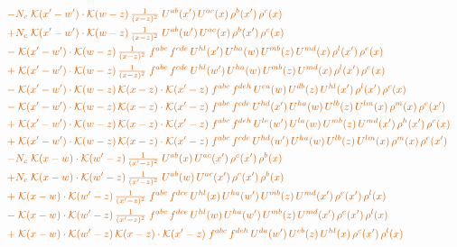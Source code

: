 \documentclass[10pt]{article}
\numberwithin{equation}{section}
\begin{document}
\begin{align}
&\quad{\color{BFK}-N_c\;\mathcal{K}(x'-w')\cdot\mathcal{K}(w-z)\,\tfrac{1}{(x-z)^{2}}\;U^{ab}(x')\,U^{ac}(x)\,\rho^{b}(x')\,\rho^{c}(x)}\notag\\
&\quad{\color{BFK}+N_c\;\mathcal{K}(x'-w')\cdot\mathcal{K}(w-z)\,\tfrac{1}{(x-z)^{2}}\;U^{ab}(w')\,U^{ac}(x)\,\rho^{b}(x')\,\rho^{c}(x)}\notag\\
&\quad{\color{BFK}-\;\mathcal{K}(x'-w')\cdot\mathcal{K}(w-z)\,\tfrac{1}{(x-z)^{2}}\;f^{abc}\,f^{cde}\,U^{hl}(x')\,U^{ha}(w)\,U^{mb}(z)\,U^{md}(x)\,\rho^{l}(x')\,\rho^{e}(x)}\notag\\
&\quad{\color{BFK}+\;\mathcal{K}(x'-w')\cdot\mathcal{K}(w-z)\,\tfrac{1}{(x-z)^{2}}\;f^{abc}\,f^{cde}\,U^{hl}(w')\,U^{ha}(w)\,U^{mb}(z)\,U^{md}(x)\,\rho^{l}(x')\,\rho^{e}(x)}\notag\\
&\quad{\color{BFK}-\;\mathcal{K}(x'-w')\cdot\mathcal{K}(w-z)\,\mathcal{K}(x-z)\cdot\mathcal{K}(x'-z)\;f^{abc}\,f^{deh}\,U^{ea}(w)\,U^{db}(z)\,U^{hl}(x')\,\rho^{l}(x')\,\rho^{c}(x)}\notag\\
&\quad{\color{BFK}-\;\mathcal{K}(x'-w')\cdot\mathcal{K}(w-z)\,\mathcal{K}(x-z)\cdot\mathcal{K}(x'-z)\;f^{abc}\,f^{cde}\,U^{hd}(x')\,U^{ha}(w)\,U^{lb}(z)\,U^{lm}(x)\,\rho^{m}(x)\,\rho^{e}(x')}\notag\\
&\quad{\color{BFK}+\;\mathcal{K}(x'-w')\cdot\mathcal{K}(w-z)\,\mathcal{K}(x-z)\cdot\mathcal{K}(x'-z)\;f^{abc}\,f^{deh}\,U^{le}(w')\,U^{la}(w)\,U^{mb}(z)\,U^{md}(x')\,\rho^{h}(x')\,\rho^{c}(x)}\notag\\
&\quad{\color{BFK}+\;\mathcal{K}(x'-w')\cdot\mathcal{K}(w-z)\,\mathcal{K}(x-z)\cdot\mathcal{K}(x'-z)\;f^{abc}\,f^{cde}\,U^{hd}(w')\,U^{ha}(w)\,U^{lb}(z)\,U^{lm}(x)\,\rho^{m}(x)\,\rho^{e}(x')}\notag\\
&\quad{\color{BFK}-N_c\;\mathcal{K}(x-w)\cdot\mathcal{K}(w'-z)\,\tfrac{1}{(x'-z)^{2}}\;U^{ab}(x)\,U^{ac}(x')\,\rho^{c}(x')\,\rho^{b}(x)}\notag\\
&\quad{\color{BFK}+N_c\;\mathcal{K}(x-w)\cdot\mathcal{K}(w'-z)\,\tfrac{1}{(x'-z)^{2}}\;U^{ab}(w)\,U^{ac}(x')\,\rho^{c}(x')\,\rho^{b}(x)}\notag\\
&\quad{\color{BFK}+\;\mathcal{K}(x-w)\cdot\mathcal{K}(w'-z)\,\tfrac{1}{(x'-z)^{2}}\;f^{abc}\,f^{dce}\,U^{hl}(x)\,U^{ha}(w')\,U^{mb}(z)\,U^{md}(x')\,\rho^{e}(x')\,\rho^{l}(x)}\notag\\
&\quad{\color{BFK}-\;\mathcal{K}(x-w)\cdot\mathcal{K}(w'-z)\,\tfrac{1}{(x'-z)^{2}}\;f^{abc}\,f^{dce}\,U^{hl}(w)\,U^{ha}(w')\,U^{mb}(z)\,U^{md}(x')\,\rho^{e}(x')\,\rho^{l}(x)}\notag\\
&\quad{\color{BFK}+\;\mathcal{K}(x-w)\cdot\mathcal{K}(w'-z)\,\mathcal{K}(x-z)\cdot\mathcal{K}(x'-z)\;f^{abc}\,f^{deh}\,U^{da}(w')\,U^{eb}(z)\,U^{hl}(x)\,\rho^{c}(x')\,\rho^{l}(x)}\notag\\

\end{align}
\end{document}
